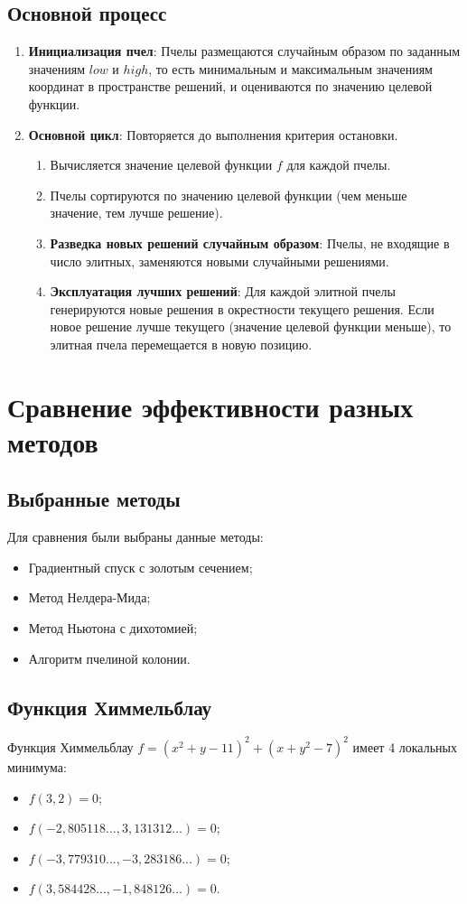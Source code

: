 \documentclass{article}
\begin{document}
\subsection*{Основной процесс}
\begin{enumerate}
    \item \textbf{Инициализация пчел}: Пчелы размещаются случайным образом по заданным значениям $low$ и $high$, то есть минимальным и максимальным значениям координат в пространстве решений, и оцениваются по значению целевой функции. 
    \item \textbf{Основной цикл}: Повторяется до выполнения критерия остановки.
    \begin{enumerate}
        \item Вычисляется значение целевой функции $f$ для каждой пчелы.
        \item  Пчелы сортируются по значению целевой функции (чем меньше значение, тем лучше решение).
        \item \textbf{Разведка новых решений случайным образом}: Пчелы, не входящие в число элитных, заменяются новыми случайными решениями.
        \item \textbf{Эксплуатация лучших решений}: Для каждой элитной пчелы генерируются новые решения в окрестности текущего решения. Если новое решение лучше текущего (значение целевой функции меньше), то элитная пчела перемещается в новую позицию.
    \end{enumerate}
\end{enumerate}

\newpage
\section*{Сравнение эффективности разных методов}
\subsection*{Выбранные методы}
Для сравнения были выбраны данные методы:
\begin{itemize}
    \item Градиентный спуск с золотым сечением;
    \item Метод Нелдера-Мида;
    \item Метод Ньютона с дихотомией;
    \item Алгоритм пчелиной колонии.
\end{itemize}

\subsection*{Функция Химмельблау}
Функция Химмельблау $f = (x^2 + y - 11)^2 + (x + y^2 - 7)^2$ имеет 4 локальных минимума:
\begin{itemize}
    \item $f(3, 2) = 0$;
    \item $f(-2,805118..., 3,131312...) = 0$;
    \item $f(-3,779310..., -3,283186...) = 0$;
    \item $f(3,584428..., -1,848126...) = 0$.
\end{itemize}
\end{document}
